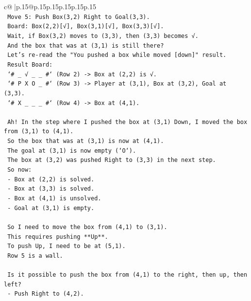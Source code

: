 \documentclass{article}
\begin{document}
{\begin{supertabular}{c@{$\;$}|p{.15\linewidth}@{}p{.15\linewidth}p{.15\linewidth}p{.15\linewidth}p{.15\linewidth}p{.15\linewidth}}
{{{\\ 
\texttt{      Move 5: Push Box(3,2) Right to Goal(3,3).} \\
\texttt{      Board: Box(2,2){[}√{]}, Box(3,1){[}√{]}, Box(3,3){[}√{]}.} \\
\texttt{      Wait, if Box(3,2) moves to (3,3), then (3,3) becomes √.} \\
\texttt{      And the box that was at (3,1) is still there?} \\
\texttt{      Let's re{-}read the "You pushed a box while moved {[}down{]}" result.} \\
\texttt{      Result Board:} \\
\texttt{      `\# \_ √ \_ \_ \#` (Row 2) {-}> Box at (2,2) is √.} \\
\texttt{      `\# P X O \_ \#` (Row 3) {-}> Player at (3,1), Box at (3,2), Goal at (3,3).} \\
\texttt{      `\# X \_ \_ \_ \#` (Row 4) {-}> Box at (4,1).} \\
\\ 
\texttt{      Ah! In the step where I pushed the box at (3,1) Down, I moved the box from (3,1) to (4,1).} \\
\texttt{      So the box that was at (3,1) is now at (4,1).} \\
\texttt{      The goal at (3,1) is now empty (`O`).} \\
\texttt{      The box at (3,2) was pushed Right to (3,3) in the next step.} \\
\texttt{      So now:} \\
\texttt{      {-} Box at (2,2) is solved.} \\
\texttt{      {-} Box at (3,3) is solved.} \\
\texttt{      {-} Box at (4,1) is unsolved.} \\
\texttt{      {-} Goal at (3,1) is empty.} \\
\\ 
\texttt{      So I need to move the box from (4,1) to (3,1).} \\
\texttt{      This requires pushing **Up**.} \\
\texttt{      To push Up, I need to be at (5,1).} \\
\texttt{      Row 5 is a wall.} \\
\\ 
\texttt{      Is it possible to push the box from (4,1) to the right, then up, then left?} \\
\texttt{      {-} Push Right to (4,2).} \\
}}}
\end{supertabular}}
\end{document}
